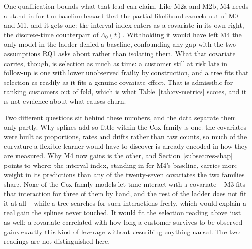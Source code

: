  
One qualification bounds what that lead can claim. Like M2a and M2b, M4 needs a stand-in for the baseline hazard that the partial likelihood cancels out of M0 and M1, and it gets one: the interval index enters as a covariate in its own right, the discrete-time counterpart of $\Lambda_0(t)$. Withholding it would have left M4 the only model in the ladder denied a baseline, confounding any gap with the two assumptions RQ1 asks about rather than isolating them. What that covariate carries, though, is selection as much as time: a customer still at risk late in follow-up is one with lower unobserved frailty by construction, and a tree fits that selection as readily as it fits a genuine covariate effect. That is admissible for ranking customers out of fold, which is what Table~\ref{tab:cv-metrics} scores, and it is not evidence about what causes churn.
 
Two different questions sit behind these numbers, and the data separate them only partly. Why splines add so little within the Cox family is one: the covariates were built as proportions, rates and drifts rather than raw counts, so much of the curvature a flexible learner would have to discover is already encoded in how they are measured. Why M4 now gains is the other, and Section~\ref{subsec:res-shap} points to where: the interval index, standing in for M4's baseline, carries more weight in its predictions than any of the twenty-seven covariates the two families share. None of the Cox-family models let time interact with a covariate -- M3 fits that interaction for three of them by hand, and the rest of the ladder does not fit it at all -- while a tree searches for such interactions freely, which would explain a real gain the splines never touched. It would fit the selection reading above just as well: a covariate correlated with how long a customer survives to be observed gains exactly this kind of leverage without describing anything causal. The two readings are not distinguished here.
 
